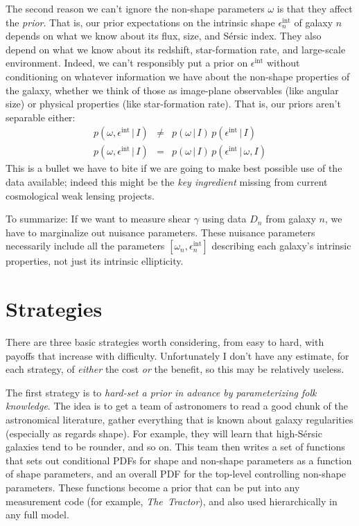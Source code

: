 \documentclass[12pt]{article}
\newcommand{\project}[1]{\textsl{#1}}
\newcommand{\thetractor}{\project{The~Tractor}}
\newcommand{\given}{\,|\,}
\newcommand{\ellip}{\epsilon}
\newcommand{\intrinsic}{\ellip^{\mathrm{int}}}
\newcommand{\prior}{I}
\newcommand{\nspars}{\omega}
\begin{document}
The second reason we can't ignore the non-shape parameters $\nspars$ is that they affect the \emph{prior}.
That is, our prior expectations on the intrinsic shape $\intrinsic_n$ of galaxy $n$
  depends on what we know about its flux, size, and S\'ersic index.
They also depend on what we know about its redshift, star-formation rate, and large-scale environment.
Indeed, we can't responsibly put a prior on $\intrinsic$ without conditioning on whatever information
  we have about the non-shape properties of the galaxy,
  whether we think of those as image-plane observables (like angular size)
  or physical properties (like star-formation rate).
That is, our priors aren't separable either:
\begin{eqnarray}
p(\nspars,\intrinsic\given\prior)
  &\ne& p(\nspars\given\prior)\,p(\intrinsic\given\prior)
\\
p(\nspars,\intrinsic\given\prior)
  &=& p(\nspars\given\prior)\,p(\intrinsic\given\nspars,\prior)
\end{eqnarray}
This is a bullet we have to bite if we are going to make best possible use of the data available;
  indeed this might be the \emph{key ingredient} missing from current cosmological weak lensing projects.

To summarize:
If we want to measure shear $\gamma$ using data $D_n$ from galaxy $n$,
  we have to marginalize out nuisance parameters.
These nuisance parameters necessarily include all the parameters $[\nspars_n,\intrinsic_n]$ describing each galaxy's
  intrinsic properties, not just its intrinsic ellipticity.

\section{Strategies}

There are three basic strategies worth considering, from easy to hard,
  with payoffs that increase with difficulty.
Unfortunately I don't have any estimate, for each strategy,
  of \emph{either} the cost \emph{or} the benefit,
  so this may be relatively useless.

The first strategy is to \emph{hard-set a prior in advance by parameterizing folk knowledge}.
The idea is to get a team of astronomers to read a good chunk of the astronomical literature,
  gather everything that is known about galaxy regularities (especially as regards shape).
For example, they will learn that high-S\'ersic galaxies tend to be rounder, and so on.
This team then writes a set of functions that sets out conditional PDFs for shape and non-shape
  parameters as a function of shape parameters,
  and an overall PDF for the top-level controlling non-shape parameters.
These functions become a prior that can be put into any measurement code
  (for example, \thetractor),
  and also used hierarchically in any full model.
\end{document}

